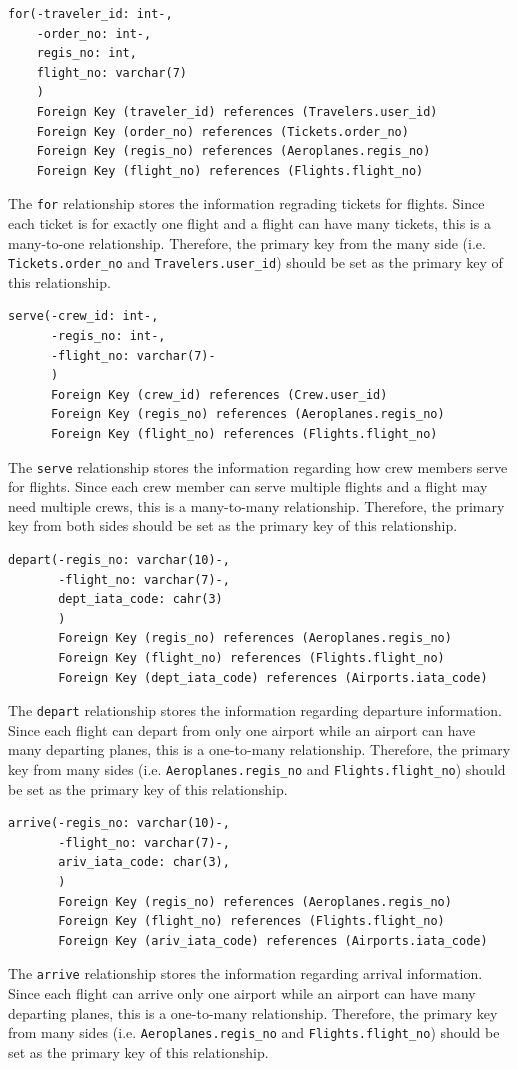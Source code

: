 \documentclass{article}
\begin{document}
	\begin{lstlisting}[keepspaces=true]
for(-traveler_id: int-, 
    -order_no: int-,
    regis_no: int, 
    flight_no: varchar(7)
    )
    Foreign Key (traveler_id) references (Travelers.user_id)
    Foreign Key (order_no) references (Tickets.order_no)
    Foreign Key (regis_no) references (Aeroplanes.regis_no)
    Foreign Key (flight_no) references (Flights.flight_no)
	\end{lstlisting}    
	The \texttt{for} relationship stores the information regrading tickets for flights. Since each ticket is for exactly one flight and a flight can have many tickets, this is a many-to-one relationship. Therefore, the primary key from the many side (i.e. \texttt{Tickets.order\_no} and \texttt{Travelers.user\_id}) should be set as the primary key of this relationship.

	\begin{lstlisting}[keepspaces=true]        
serve(-crew_id: int-, 
      -regis_no: int-, 
      -flight_no: varchar(7)-
      )
      Foreign Key (crew_id) references (Crew.user_id)
      Foreign Key (regis_no) references (Aeroplanes.regis_no)
      Foreign Key (flight_no) references (Flights.flight_no)
	\end{lstlisting}    
	The \texttt{serve} relationship stores the information regarding how crew members serve for flights. Since each crew member can serve multiple flights and a flight may need multiple crews, this is a many-to-many relationship. Therefore, the primary key from both sides should be set as the primary key of this relationship.

	\begin{lstlisting}[keepspaces=true] 
depart(-regis_no: varchar(10)-,
       -flight_no: varchar(7)-,
       dept_iata_code: cahr(3)
       )  
       Foreign Key (regis_no) references (Aeroplanes.regis_no)
       Foreign Key (flight_no) references (Flights.flight_no)
       Foreign Key (dept_iata_code) references (Airports.iata_code)
	\end{lstlisting}    
	The \texttt{depart} relationship stores the information regarding departure information. Since each flight can depart from only one airport while an airport can have many departing planes, this is a one-to-many relationship. Therefore, the primary key from many sides (i.e. \texttt{Aeroplanes.regis\_no} and \texttt{Flights.flight\_no}) should be set as the primary key of this relationship.

	\begin{lstlisting}[keepspaces=true]
arrive(-regis_no: varchar(10)-,
       -flight_no: varchar(7)-, 
       ariv_iata_code: char(3),
       )  
       Foreign Key (regis_no) references (Aeroplanes.regis_no)
       Foreign Key (flight_no) references (Flights.flight_no)
       Foreign Key (ariv_iata_code) references (Airports.iata_code)
	\end{lstlisting}    
	The \texttt{arrive} relationship stores the information regarding arrival information. Since each flight can arrive only one airport while an airport can have many departing planes, this is a one-to-many relationship. Therefore, the primary key from many sides (i.e. \texttt{Aeroplanes.regis\_no} and \texttt{Flights.flight\_no}) should be set as the primary key of this relationship.
\end{document}
